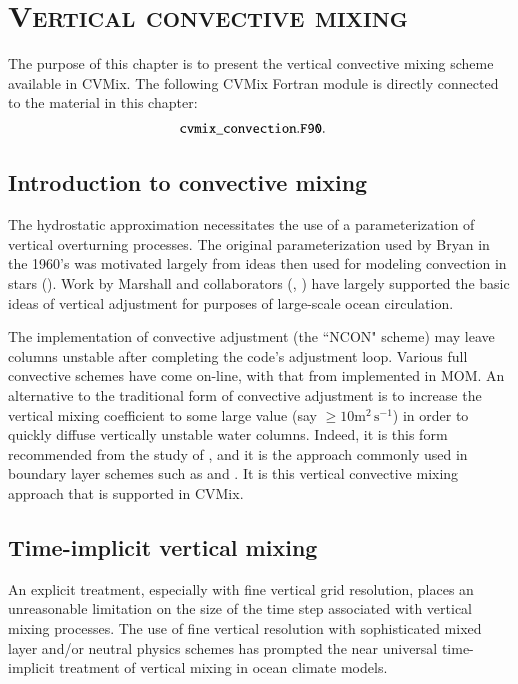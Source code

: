 \chapter{\scshape Vertical convective mixing}
\label{chapter:cvmix_convection}

\minitoc
\vspace{.5cm}

The purpose of this chapter is to present the vertical convective
mixing scheme available in CVMix.  The following CVMix Fortran module
is directly connected to the material in this chapter:
\begin{align*} 
 &  {\tt cvmix\_convection.F90}.
\end{align*}


\section{Introduction to convective mixing}
\label{section:intro}

The hydrostatic approximation necessitates the use of a
parameterization of vertical overturning processes.  The original
parameterization used by Bryan in the 1960's was motivated largely
from ideas then used for modeling convection in stars
(\cite{Bryan1969}).  Work by Marshall and collaborators
(\cite{KlingerConvection}, \cite{MITgcm}) have largely supported the
basic ideas of vertical adjustment for purposes of large-scale ocean
circulation.

The \cite{CoxModel} implementation of convective adjustment (the
``NCON" scheme) may leave columns unstable after completing the code's
adjustment loop.  Various full convective schemes have come on-line,
with that from \cite{Rahmstorf1993} implemented in MOM.  An
alternative to the traditional form of convective adjustment is to
increase the vertical mixing coefficient to some large value (say $\ge
10 \mbox{m}^{2} \, \mbox{s}^{-1}$) in order to quickly diffuse
vertically unstable water columns.  Indeed, it is this form
recommended from the study of \cite{KlingerConvection}, and it is the
approach commonly used in boundary layer schemes such as \cite{PPvmix}
and \cite{LargeKPP}.  It is this vertical convective mixing approach
that is supported in CVMix.  


\section{Time-implicit vertical mixing}
\label{section:time-implicit-vmix}

An explicit treatment, especially with fine vertical grid resolution,
places an unreasonable limitation on the size of the time step
associated with vertical mixing processes.  The use of fine vertical
resolution with sophisticated mixed layer and/or neutral physics
schemes has prompted the near universal time-implicit treatment of
vertical mixing in ocean climate models.

